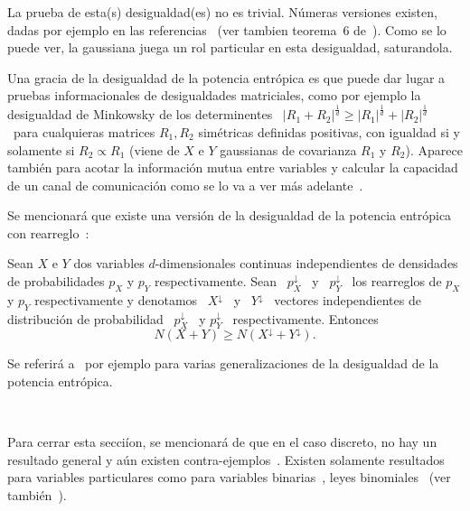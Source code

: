 La  prueba  de  esta(s)  desigualdad(es)  no es  trivial.   N\'umeras  versiones
existen,  dadas por  ejemplo  en las  referencias~\cite{Bla65, Sta59,  ShaWea64,
  Rio07,  Rio11,  Rio17,  CovTho06,  DemCov91,  Lie78,  VerGuo06}  (ver  tambien
teorema~6 de~\cite{Lie75}).   Como se  lo puede ver,  la gaussiana juega  un rol
particular en esta desigualdad, saturandola.

Una gracia de la desigualdad de la potencia entr\'opica es que puede dar lugar a
pruebas  informacionales  de  desigualdades  matriciales, como  por  ejemplo  la
desigualdad  de Minkowsky  de los  determinentes  \ $|R_1  + R_2|^{\frac1d}  \ge
|R_1|^{\frac1d}  +  |R_2|^{\frac1d}$  \  para cualquieras  matrices  $R_1,  R_2$
sim\'etricas definidas  positivas, con igualdad  si y solamente si  $R_2 \propto
R_1$  (viene de  $X$ e  $Y$ gaussianas  de covarianza  $R_1$ y  $R_2$).  Aparece
tambi\'en  para acotar  la informaci\'on  mutua  entre variables  y calcular  la
capacidad  de   un  canal  de  comunicaci\'on   como  se  lo  va   a  ver  m\'as
adelante~\cite{CovTho06, DemCov91, Rio07, Joh04}.

Se  mencionar\'a que  existe  una versi\'on  de  la desigualdad  de la  potencia
entr\'opica con rearreglo~\cite{WanMad04}:
%
\begin{teorema}
\label{Teo:SZ:EPIRearreglo}
%
Sean  $X$ e  $Y$  dos variables  $d$-dimensionales  continuas independientes  de
densidades   de  probabilidades   $p_X$   y  $p_Y$   respectivamente.   Sean   \
$p^\downarrow_X$  \ y  \  $p^\downarrow_Y$ \  los  rearreglos de  $p_X$ y  $p_Y$
respectivamente y  denotamos \  $X^\downarrow$ \ y  \ $Y^\downarrow$  \ vectores
independientes  de  distribuci\'on  de   probabilidad  \  $p^\downarrow_X$  \  y
$p^\downarrow_Y$ \ respectivamente.  Entonces
  \[
  N(X + Y) \ge N(X^\downarrow + Y^\downarrow).
  \]
\end{teorema}

Se referir\'a a~\cite[y Ref.]{MadBar07} por ejemplo para varias generalizaciones
de la desigualdad de la potencia entr\'opica.

\

Para cerrar esta secci\'ion, se mencionar\'a  de que en el caso discreto, no hay
un  resultado general  y a\'un  existen contra-ejemplos~\cite[Sec.~IV]{JohYu10}.
Existen  solamente resultados  para variables  particulares como  para variables
binarias~\cite{ShaWyn90},   leyes   binomiales~\cite{HarVig03,  ShaDas11}   (ver
tambi\'en~\cite{JohYu10, HagAbb14}).


